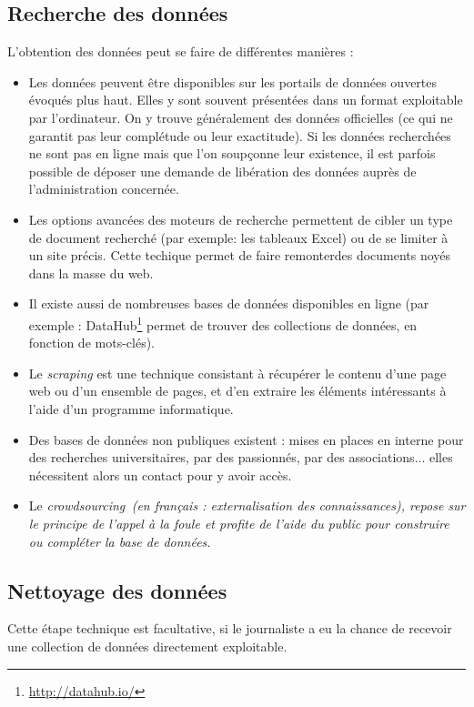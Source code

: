 \subsection{Recherche des données}
L'obtention des données peut se faire de différentes manières :
\begin{itemize}
\item Les données peuvent être disponibles sur les portails de données ouvertes évoqués 
plus haut. Elles y sont souvent présentées dans un format exploitable par l'ordinateur. 
On y trouve généralement des données officielles (ce qui ne garantit pas leur 
complétude ou leur exactitude). Si les données recherchées ne sont pas en ligne mais 
que l'on soupçonne leur existence, il est parfois possible de déposer une demande de \og libération des données \fg auprès de l'administration concernée.
\item Les options avancées des moteurs de recherche permettent de cibler un type de 
document recherché (par exemple: les tableaux Excel) ou de se limiter à un site précis. 
Cette techique permet de faire \og remonter\fg des documents noyés dans la masse du web.
\item Il existe aussi de nombreuses bases de données disponibles en ligne (par exemple : DataHub\footnote{\url{http://datahub.io/}} permet de trouver des collections de données, en fonction de mots-clés).
\item Le \textit{scraping} est une technique consistant à récupérer le contenu d'une page web ou d'un ensemble de pages, et d'en extraire les éléments intéressants à 
l'aide d'un programme informatique.
\item Des bases de données non publiques existent : mises en places en interne pour des recherches universitaires, par des passionnés, par des associations... elles nécessitent alors un contact pour y avoir accès.
\item Le \em crowdsourcing\em\, (en français : externalisation des connaissances), repose sur le principe de \og l'appel à la foule \fg et profite de l'aide du public pour
construire ou compléter la base de données.
\end{itemize}

\subsection{Nettoyage des données}

Cette étape technique est facultative, si le journaliste a eu la chance 
de recevoir une collection de données directement exploitable.

